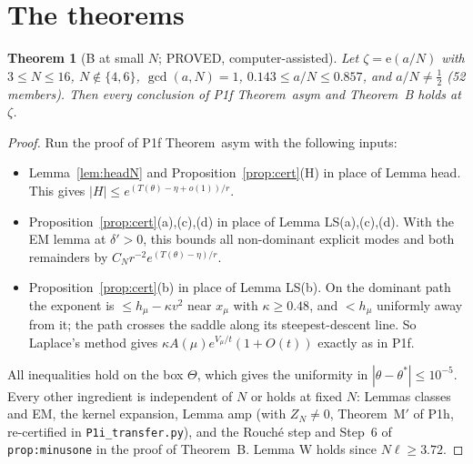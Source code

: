 \documentclass[11pt]{article}
\newtheorem{theorem}{Theorem}\newtheorem{lemma}[theorem]{Lemma}\newtheorem{proposition}[theorem]{Proposition}
\theoremstyle{remark}\newtheorem{remark}[theorem]{Remark}
\newcommand{\e}{\mathrm{e}}
\begin{document}
\section{The theorems}
\begin{theorem}[B at small $N$; PROVED, computer-assisted]\label{thm:Bsmall}
Let $\zeta=\e(a/N)$ with $3\le N\le16$, $N\notin\{4,6\}$, $\gcd(a,N)=1$, $0.143\le a/N\le0.857$, and $a/N\ne\frac12$ (52 members). Then every conclusion of P1f Theorem~asym and Theorem~B holds at $\zeta$.
\end{theorem}
\begin{proof}
Run the proof of P1f Theorem~asym with the following inputs:
\begin{itemize}
\item Lemma~\ref{lem:headN} and Proposition~\ref{prop:cert}(H) in place of Lemma head. This gives $|H|\le e^{(T(\theta)-\eta+o(1))/r}$.
\item Proposition~\ref{prop:cert}(a),(c),(d) in place of Lemma LS(a),(c),(d). With the EM lemma at $\delta'>0$, this bounds all non-dominant explicit modes and both remainders by $C_Nr^{-2}e^{(T(\theta)-\eta)/r}$.
\item Proposition~\ref{prop:cert}(b) in place of Lemma LS(b). On the dominant path the exponent is $\le h_\mu-\kappa v^2$ near $x_\mu$ with $\kappa\ge0.48$, and $<h_\mu$ uniformly away from it; the path crosses the saddle along its steepest-descent line. So Laplace's method \cite{Olver1974} gives $\kappa A(\mu)e^{V_\mu/t}(1+O(t))$ exactly as in P1f.
\end{itemize}
All inequalities hold on the box $\Theta$, which gives the uniformity in $|\theta-\theta^*|\le10^{-5}$.
Every other ingredient is independent of $N$ or holds at fixed $N$: Lemmas classes and EM, the kernel expansion, Lemma amp (with $Z_N\ne0$, Theorem~M$'$ of P1h, re-certified in \texttt{P1i\_transfer.py}), and the Rouch\'e step and Step~6 of \texttt{prop:minusone} in the proof of Theorem~B.
Lemma W holds since $N\ell\ge3.72$.
\end{proof}
\end{document}
